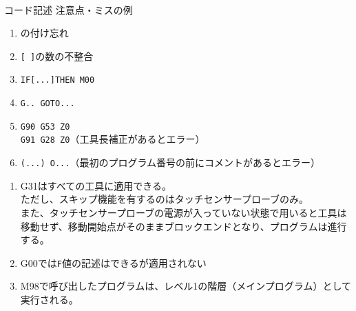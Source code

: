 \begin{appendices}
\Appendixpart


\clearpage
~\vfill
\begin{Column}{コード記述 注意点・ミスの例}
\begin{enumerate}
\item \ttNum\hx の付け忘れ
\item \verb|[ ]|の数の不整合
\item \verb|IF[...]THEN M00|
\item \verb|G.. GOTO...|
\item \verb|G90 G53 Z0|\\
      \verb|G91 G28 Z0|（工具長補正があるとエラー）
\item \verb|(...) O...|（最初のプログラム番号の前にコメントがあるとエラー）
\end{enumerate}
\tcbline*
\begin{enumerate}
\item
{\ttfamily G31}はすべての工具に適用できる。\\
ただし、スキップ機能を有するのはタッチセンサープローブのみ。\\
また、タッチセンサープローブの電源が入っていない状態で用いると工具は移動せず、移動開始点がそのままブロックエンドとなり、プログラムは進行する。
\item {\ttfamily G00}では\verb|F|値の記述はできるが適用されない
\item {\ttfamily M98}で呼び出したプログラムは、レベル1の階層（メインプログラム）として実行される。
\end{enumerate}
\end{Column}
\end{appendices}

